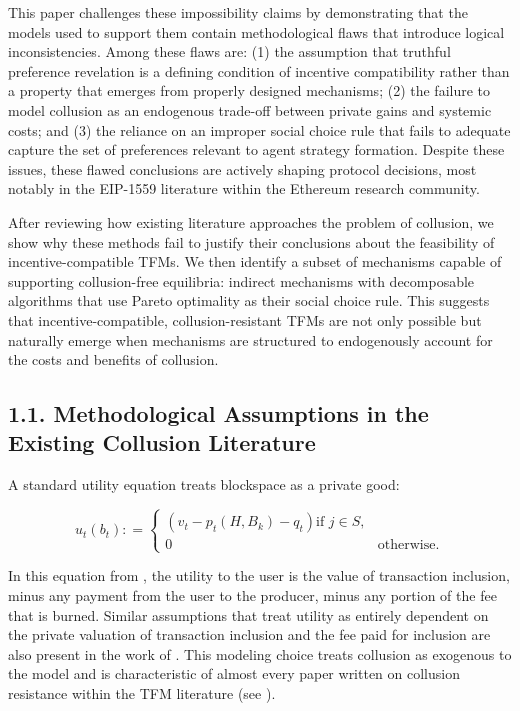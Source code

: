 \documentclass[oneside]{article}   	%
\begin{document}
This paper challenges these impossibility claims by demonstrating that the models used to support them contain methodological flaws that introduce logical inconsistencies. Among these flaws are: (1) the assumption that truthful preference revelation is a defining condition of incentive compatibility rather than a property that emerges from properly designed mechanisms; (2) the failure to model collusion as an endogenous trade-off between private gains and systemic costs; and (3) the reliance on an improper social choice rule that fails to adequate capture the set of preferences relevant to agent strategy formation. Despite these issues, these flawed conclusions are actively shaping protocol decisions, most notably in the EIP-1559 literature within the Ethereum research community.

After reviewing how existing literature approaches the problem of collusion, we show why these methods fail to justify their conclusions about the feasibility of incentive-compatible TFMs. We then identify a subset of mechanisms capable of supporting collusion-free equilibria: indirect mechanisms with decomposable algorithms that use Pareto optimality as their social choice rule. This suggests that incentive-compatible, collusion-resistant TFMs are not only possible but naturally emerge when mechanisms are structured to endogenously account for the costs and benefits of collusion.

\subsection*{1.1. Methodological Assumptions in the Existing Collusion Literature}

A standard utility equation treats blockspace as a private good:

\[
u_t\left(b_t\right) : =
\begin{cases}
\left(
        v_t - p_t\left(H,B_k\right) - q_t
\right) \text{if } j \in S, \\ 0 & \text{otherwise.}
\end{cases}
\]

In this equation from \cite{roughgarden2024}, the utility to the user is the value of transaction inclusion, minus any payment from the user to the producer, minus any portion of the fee that is burned. Similar assumptions that treat utility as entirely dependent on the private valuation of transaction inclusion and the fee paid for inclusion are also present in the work of \cite{chung2023foundations}. This modeling choice treats collusion as exogenous to the model and is characteristic of almost every paper written on collusion resistance within the TFM literature (see \cite{chen2022bayesian, ferreira2021dynamic, wu2023maximizing, damle2024designing, gafni2024barriers, bahrani2023transaction, bahrani2024transaction, chung2024collusion}).
\end{document}
